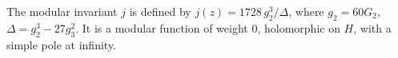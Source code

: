 The modular invariant $j$ is defined by $j(z) = 1728 \, g_2^3 / \Delta$, where $g_2 = 60G_2$, $\Delta = g_2^3 - 27g_3^2$. It is a modular function of weight 0, holomorphic on $H$, with a simple pole at infinity.
